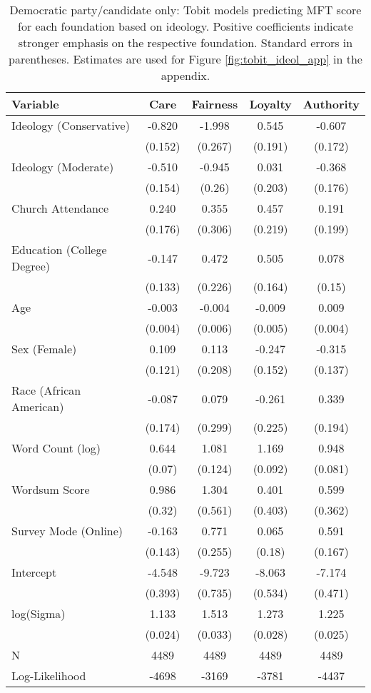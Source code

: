 \begin{table}[ht]
\centering
\caption[Democratic party/candidate only: Tobit models predicting MFT score for each foundation based 
           on ideology]{Democratic party/candidate only: Tobit models predicting MFT score for each foundation based 
           on ideology. Positive coefficients indicate stronger emphasis on the respective 
           foundation. Standard errors in parentheses. Estimates are used for 
           Figure \ref{fig:tobit_ideol_app} in the appendix.} 
\label{tab:tobit_dem}
\begingroup\footnotesize
\begin{tabular}{lcccc}
  \hline
Variable & Care & Fairness & Loyalty & Authority \\ 
  \hline
Ideology (Conservative) & -0.820 & -1.998 &  0.545 & -0.607 \\ 
   & (0.152) & (0.267) & (0.191) & (0.172) \\ 
  Ideology (Moderate) & -0.510 & -0.945 &  0.031 & -0.368 \\ 
   & (0.154) & (0.26) & (0.203) & (0.176) \\ 
  Church Attendance &  0.240 &  0.355 &  0.457 &  0.191 \\ 
   & (0.176) & (0.306) & (0.219) & (0.199) \\ 
  Education (College Degree) & -0.147 &  0.472 &  0.505 &  0.078 \\ 
   & (0.133) & (0.226) & (0.164) & (0.15) \\ 
  Age & -0.003 & -0.004 & -0.009 &  0.009 \\ 
   & (0.004) & (0.006) & (0.005) & (0.004) \\ 
  Sex (Female) &  0.109 &  0.113 & -0.247 & -0.315 \\ 
   & (0.121) & (0.208) & (0.152) & (0.137) \\ 
  Race (African American) & -0.087 &  0.079 & -0.261 &  0.339 \\ 
   & (0.174) & (0.299) & (0.225) & (0.194) \\ 
  Word Count (log) &  0.644 &  1.081 &  1.169 &  0.948 \\ 
   & (0.07) & (0.124) & (0.092) & (0.081) \\ 
  Wordsum Score &  0.986 &  1.304 &  0.401 &  0.599 \\ 
   & (0.32) & (0.561) & (0.403) & (0.362) \\ 
  Survey Mode (Online) & -0.163 &  0.771 &  0.065 &  0.591 \\ 
   & (0.143) & (0.255) & (0.18) & (0.167) \\ 
  Intercept & -4.548 & -9.723 & -8.063 & -7.174 \\ 
   & (0.393) & (0.735) & (0.534) & (0.471) \\ 
  log(Sigma) &  1.133 &  1.513 &  1.273 &  1.225 \\ 
   & (0.024) & (0.033) & (0.028) & (0.025) \\ 
   \hline
N & 4489 & 4489 & 4489 & 4489 \\ 
  Log-Likelihood & -4698 & -3169 & -3781 & -4437 \\ 
   \hline
\end{tabular}
\endgroup
\end{table}

